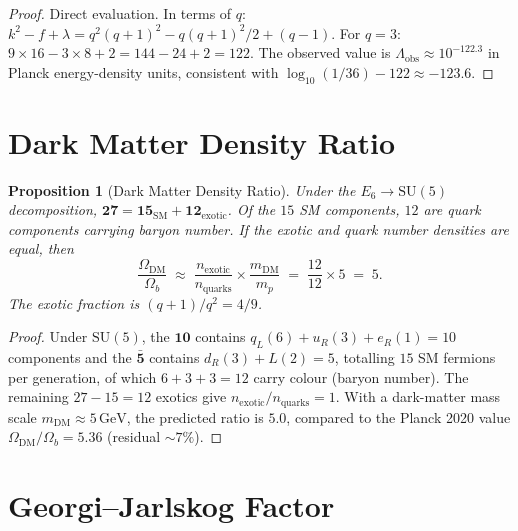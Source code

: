 \documentclass[12pt,a4paper]{article}
\newtheorem{proposition}[theorem]{Proposition}
\begin{document}
\begin{proof}
Direct evaluation.
In terms of $q$:
$k^2 - f + \lambda = q^2(q{+}1)^2 - q(q{+}1)^2\!/2 + (q{-}1)$.
For $q = 3$: $9 \times 16 - 3 \times 8 + 2 = 144 - 24 + 2 = 122$.
The observed value is
$\Lambda_{\mathrm{obs}} \approx 10^{-122.3}$ in Planck energy-density units,
consistent with $\log_{10}(1/36) - 122 \approx -123.6$.
\end{proof}

\section{Dark Matter Density Ratio}
\label{sec:dark-matter}

\begin{proposition}[Dark Matter Density Ratio]\label{prop:dark-matter}
Under the $E_6 \to \mathrm{SU}(5)$ decomposition,
$\mathbf{27} = \mathbf{15}_{\mathrm{SM}} + \mathbf{12}_{\mathrm{exotic}}$.
Of the $15$ SM components, $12$ are quark components carrying baryon number.
If the exotic and quark number densities are equal, then
\[
  \frac{\Omega_{\mathrm{DM}}}{\Omega_b}
  \;\approx\;
  \frac{n_{\mathrm{exotic}}}{n_{\mathrm{quarks}}}
  \times \frac{m_{\mathrm{DM}}}{m_p}
  \;=\; \frac{12}{12}\times 5
  \;=\; 5.
\]
The exotic fraction is $(q{+}1)/q^2 = 4/9$.
\end{proposition}

\begin{proof}
Under $\mathrm{SU}(5)$, the $\mathbf{10}$ contains
$q_L(6) + u_R(3) + e_R(1) = 10$ components and the
$\bar{\mathbf{5}}$ contains $d_R(3) + L(2) = 5$,
totalling $15$ SM fermions per generation,
of which $6 + 3 + 3 = 12$ carry colour (baryon number).
The remaining $27 - 15 = 12$ exotics give
$n_{\mathrm{exotic}}/n_{\mathrm{quarks}} = 1$.
With a dark-matter mass scale $m_{\mathrm{DM}} \approx 5\,\mathrm{GeV}$,
the predicted ratio is $5.0$, compared to the Planck 2020 value
$\Omega_{\mathrm{DM}}/\Omega_b = 5.36$ (residual $\sim 7\%$).
\end{proof}

\section{Georgi--Jarlskog Factor}
\label{sec:gj}
\end{document}
